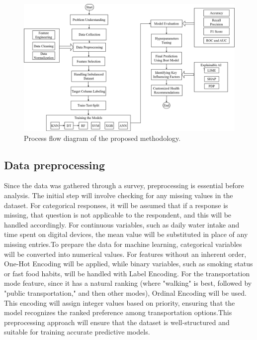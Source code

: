 \begin{figure}[!htbp]
    \centering
    \includegraphics[width=1.0\textwidth]{figures/methodoloy.png}
    
    \vspace{7pt} %
    \caption{Process flow diagram of the proposed methodology.}
    \label{methodology}
\end{figure}


\subsection{Data preprocessing}
Since the data was gathered through a survey, preprocessing is essential before analysis. The initial step will involve checking for any missing values in the dataset. For categorical responses, it will be assumed that if a response is missing, that question is not applicable to the respondent, and this will be handled accordingly. For continuous variables, such as daily water intake and time spent on digital devices, the mean value will be substituted in place of any missing entries.To prepare the data for machine learning, categorical variables will be converted into numerical values. For features without an inherent order, One-Hot Encoding will be applied, while binary variables, such as smoking status or fast food habits, will be handled with Label Encoding. For the transportation mode feature, since it has a natural ranking (where "walking" is best, followed by "public transportation," and then other modes), Ordinal Encoding will be used. This encoding will assign integer values based on priority, ensuring that the model recognizes the ranked preference among transportation options.This preprocessing approach will ensure that the dataset is well-structured and suitable for training accurate predictive models. 
 
